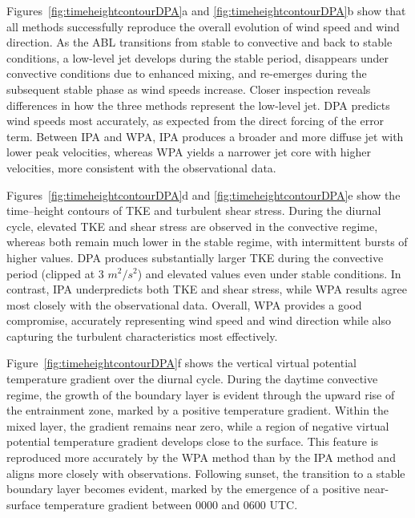 Figures~\ref{fig:timeheightcontourDPA}a and \ref{fig:timeheightcontourDPA}b show that all methods successfully reproduce the overall evolution of wind speed and wind direction. As the ABL transitions from stable to convective and back to stable conditions, a low-level jet develops during the stable period, disappears under convective conditions due to enhanced mixing, and re-emerges during the subsequent stable phase as wind speeds increase. Closer inspection reveals differences in how the three methods represent the low-level jet. DPA predicts wind speeds most accurately, as expected from the direct forcing of the error term. Between IPA and WPA, IPA produces a broader and more diffuse jet with lower peak velocities, whereas WPA yields a narrower jet core with higher velocities, more consistent with the observational data. 

Figures~\ref{fig:timeheightcontourDPA}d and \ref{fig:timeheightcontourDPA}e show the time–height contours of TKE and turbulent shear stress. During the diurnal cycle, elevated TKE and shear stress are observed in the convective regime, whereas both remain much lower in the stable regime, with intermittent bursts of higher values. DPA produces substantially larger TKE during the convective period (clipped at 3 $m^2/s^2$) and elevated values even under stable conditions. In contrast, IPA underpredicts both TKE and shear stress, while WPA results agree most closely with the observational data. Overall, WPA provides a good compromise, accurately representing wind speed and wind direction while also capturing the turbulent characteristics most effectively.

Figure~\ref{fig:timeheightcontourDPA}f shows the vertical virtual potential temperature gradient over the diurnal cycle. During the daytime convective regime, the growth of the boundary layer is evident through the upward rise of the entrainment zone, marked by a positive temperature gradient. Within the mixed layer, the gradient remains near zero, while a region of negative virtual potential temperature gradient develops close to the surface. This feature is reproduced more accurately by the WPA method than by the IPA method and aligns more closely with observations. Following sunset, the transition to a stable boundary layer becomes evident, marked by the emergence of a positive near-surface temperature gradient between 0000 and 0600 UTC.

